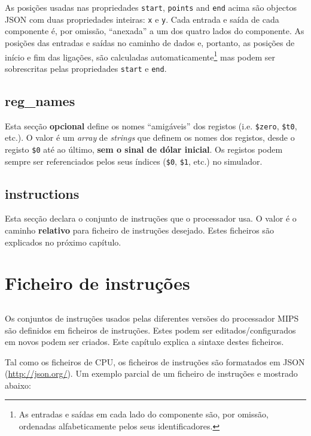 \documentclass[11pt,a4paper,twoside,titlepage]{report}
\begin{document}
As posições usadas nas propriedades \verb+start+, \verb+points+ and \verb+end+
acima são objectos JSON com duas propriedades inteiras: \verb+x+ e \verb+y+.
Cada entrada e saída de cada componente é, por omissão, ``anexada'' a um dos
quatro lados do componente.
As posições das entradas e saídas no caminho de dados e, portanto, as posições
de início e fim das ligações, são calculadas automaticamente\footnote{As
entradas e saídas em cada lado do componente são, por omissão, ordenadas
alfabeticamente pelos seus identificadores.} mas podem ser sobrescritas pelas
propriedades \verb+start+ e \verb+end+.


\section{reg\_names}

Esta secção \textbf{opcional} define os nomes ``amigáveis'' dos registos (i.e.
\verb+$zero+, \verb+$t0+, etc.).
O valor é um \emph{array} de \emph{strings} que definem os nomes dos registos,
desde o registo \verb+$0+ até ao último, \textbf{sem o sinal de dólar inicial}.
Os registos podem sempre ser referenciados pelos seus índices (\verb+$0+,
\verb+$1+, etc.) no simulador.


\section{instructions}

Esta secção declara o conjunto de instruções que o processador usa.
O valor é o caminho \textbf{relativo} para ficheiro de instruções desejado.
Estes ficheiros são explicados no próximo capítulo.


\chapter{Ficheiro de instruções}

\section*{}

Os conjuntos de instruções usados pelas diferentes versões do processador MIPS
são definidos em ficheiros de instruções.
Estes podem ser editados/configurados em novos podem ser criados.
Este capítulo explica a sintaxe destes ficheiros.

Tal como os ficheiros de CPU, os ficheiros de instruções são formatados em
JSON (\url{http://json.org/}).
Um exemplo parcial de um ficheiro de instruções e mostrado abaixo:
\end{document}
